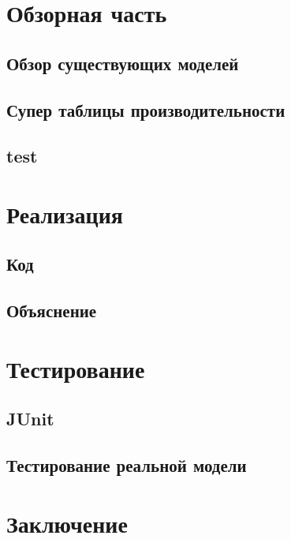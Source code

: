 \chapter{Обзорная часть}
	\section{Обзор существующих моделей}
	\section{Супер таблицы производительности}
	\section{test}

\chapter{Реализация}
	\section{Код}
	\section{Объяснение}
	
\chapter{Тестирование}
	\section{JUnit}
	\section{Тестирование реальной модели}

\chapter*{Заключение}
